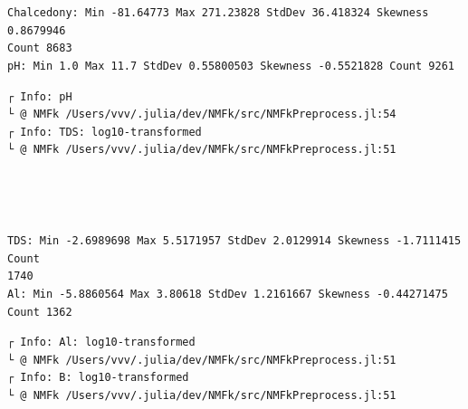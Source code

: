 \documentclass[11pt]{article}
\begin{document}
    \begin{center}
    \end{center}
    { \hspace*{\fill} \\}

    \begin{center}
    \end{center}
    { \hspace*{\fill} \\}

    \begin{Verbatim}[commandchars=\\\{\}]
Chalcedony: Min -81.64773 Max 271.23828 StdDev 36.418324 Skewness 0.8679946
Count 8683
pH: Min 1.0 Max 11.7 StdDev 0.55800503 Skewness -0.5521828 Count 9261
    \end{Verbatim}

    \begin{Verbatim}[commandchars=\\\{\}]
┌ Info: pH
└ @ NMFk /Users/vvv/.julia/dev/NMFk/src/NMFkPreprocess.jl:54
┌ Info: TDS: log10-transformed
└ @ NMFk /Users/vvv/.julia/dev/NMFk/src/NMFkPreprocess.jl:51
    \end{Verbatim}

    \begin{center}
    \end{center}
    { \hspace*{\fill} \\}

    \begin{center}
    \end{center}
    { \hspace*{\fill} \\}

    \begin{Verbatim}[commandchars=\\\{\}]
TDS: Min -2.6989698 Max 5.5171957 StdDev 2.0129914 Skewness -1.7111415 Count
1740
Al: Min -5.8860564 Max 3.80618 StdDev 1.2161667 Skewness -0.44271475 Count 1362
    \end{Verbatim}

    \begin{Verbatim}[commandchars=\\\{\}]
┌ Info: Al: log10-transformed
└ @ NMFk /Users/vvv/.julia/dev/NMFk/src/NMFkPreprocess.jl:51
┌ Info: B: log10-transformed
└ @ NMFk /Users/vvv/.julia/dev/NMFk/src/NMFkPreprocess.jl:51
    \end{Verbatim}
\end{document}
